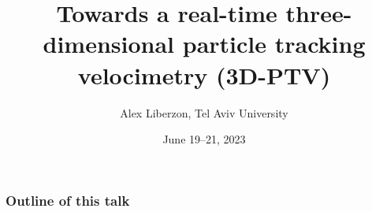 \documentclass[aspectratio=169]{beamer}
\title{Towards a real-time three-dimensional particle tracking velocimetry (3D-PTV)}
\date{June 19--21, 2023}
\author[Liberzon]{Alex Liberzon, Tel Aviv University}
\begin{document}
\begin{frame}
    \titlepage
\end{frame}

\begin{frame}\frametitle{Outline of this talk}
    \begin{card}	
    \tableofcontents
    \end{card}
\end{frame}





% 
% 

%
%
% 
\end{document}

